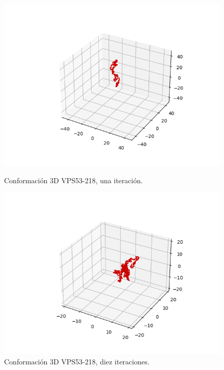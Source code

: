 \documentclass[a4paper,11pt,titlepage]{article}
\theoremstyle{definition}
\begin{document}
\begin{figure}[H]
    \centering
    \begin{minipage}[c]{0.31\textwidth}
        \centering
        \includegraphics[width=\textwidth]{images/VPS53-218-db_one.png}
        \caption{Conformación 3D VPS53-218, una iteración.}
        \label{fig:VPS53-218-one}
    \end{minipage}
    \hfill
    \begin{minipage}[c]{0.31\textwidth}
        \centering
        \includegraphics[width=\textwidth]{images/VPS53-218-db_iter.png}
        \caption{Conformación 3D VPS53-218, diez iteraciones.}
        \label{fig:VPS53-218-multi}
    \end{minipage}

\end{figure}
\end{document}
